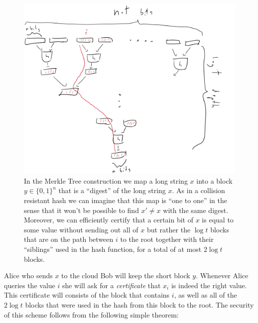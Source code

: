 \begin{figure}
\centering
\includegraphics[width=\textwidth, height=0.25\paperheight, keepaspectratio]{../figure/merkle-tree.jpg}
\caption{In the Merkle Tree construction we map a long string \(x\) into
a block \(y\in\{0,1\}^n\) that is a ``digest'' of the long string \(x\).
As in a collision resistant hash we can imagine that this map is ``one
to one'' in the sense that it won't be possible to find \(x'\neq x\)
with the same digest. Moreover, we can efficiently certify that a
certain bit of \(x\) is equal to some value without sending out all of
\(x\) but rather the \(\log t\) blocks that are on the path between
\(i\) to the root together with their ``siblings'' used in the hash
function, for a total of at most \(2\log t\) blocks.}
\label{merkletreefig}
\end{figure}

Alice who sends \(x\) to the cloud Bob will keep the short block \(y\).
Whenever Alice queries the value \(i\) she will ask for a
\emph{certificate} that \(x_i\) is indeed the right value. This
certificate will consists of the block that contains \(i\), as well as
all of the \(2\log t\) blocks that were used in the hash from this block
to the root. The security of this scheme follows from the following
simple theorem:

\hypertarget{merkletreefig}{}

